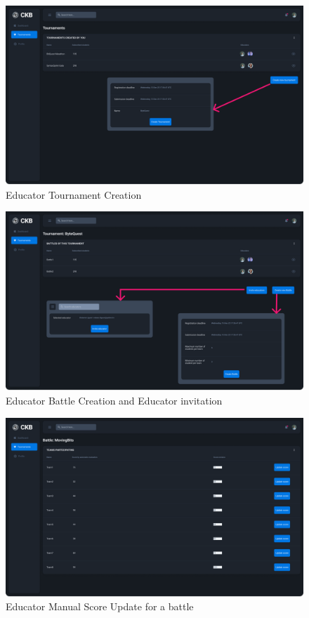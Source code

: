 \begin{figure}[H]
    \centering
    \includegraphics[width=\textwidth]{Images/TournamentCreationEducator.png}
    \caption{Educator Tournament Creation}
    \label{fig:student-Tournament-Completed}
\end{figure}

\begin{figure}[H]
    \centering
    \includegraphics[width=\textwidth]{Images/BattleEducator.png}
    \caption{Educator Battle Creation and Educator invitation}
    \label{fig:student-Tournament-Completed}
\end{figure}

\begin{figure}[H]
    \centering
    \includegraphics[width=\textwidth]{Images/ManualScoreUpdateEducator.png}
    \caption{Educator Manual Score Update for a battle}
    \label{fig:student-Tournament-Completed}
\end{figure}

